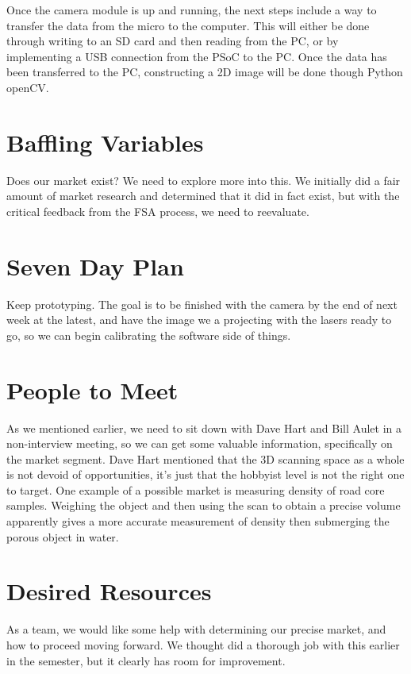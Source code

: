 \documentclass[10pt]{article}
\begin{document}
	Once the camera module is up and running, the next steps include a way to transfer the data from the micro to the computer. This will either be done through writing to an SD card and then reading from the PC, or by implementing a USB connection from the PSoC to the PC. Once the data has been transferred to the PC, constructing a 2D image will be done though Python openCV.

\section{Baffling Variables}
Does our market exist? We need to explore more into this. We initially did a fair amount of market research and determined that it did in fact exist, but with the critical feedback from the FSA process, we need to reevaluate. 

\section{Seven Day Plan}
Keep prototyping. The goal is to be finished with the camera by the end of next week at the latest, and have the image we a projecting with the lasers ready to go, so we can begin calibrating the software side of things.

\section{People to Meet}
As we mentioned earlier, we need to sit down with Dave Hart and Bill Aulet in a non-interview meeting, so we can get some valuable information, specifically on the market segment. Dave Hart mentioned that the 3D scanning space as a whole is not devoid of opportunities, it's just that the hobbyist  level is not the right one to target. One example of a possible market is measuring density of road core samples. Weighing the object and then using the scan to obtain a precise volume apparently gives a more accurate measurement of density then submerging the porous object in water. 

\section{Desired Resources}
As a team, we would like some help with determining our precise market, and how to proceed moving forward. We thought did a thorough job with this earlier in the semester, but it clearly has room for improvement. 
\end{document}
